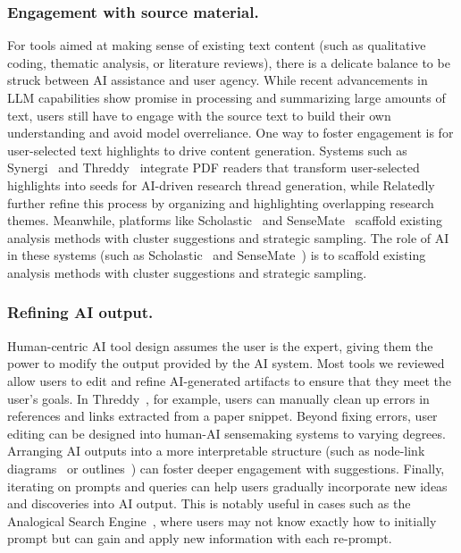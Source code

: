 \subsubsection{Engagement with source material.} For tools aimed at making sense of existing text content (such as qualitative coding, thematic analysis, or literature reviews), there is a delicate balance to be struck between AI assistance and user agency. While recent advancements in LLM capabilities show promise in processing and summarizing large amounts of text, users still have to engage with the source text to build their own understanding and avoid model overreliance. One way to foster engagement is for user-selected text highlights to drive content generation. Systems such as Synergi~\cite{synergi} and Threddy~\cite{threddy} integrate PDF readers that transform user-selected highlights into seeds for AI-driven research thread generation, while Relatedly~\cite{Relatedly} further refine this process by organizing and highlighting overlapping research themes. Meanwhile, platforms like Scholastic~\cite{scholastic} and SenseMate~\cite{sensemate} scaffold existing analysis methods with cluster suggestions and strategic sampling. The role of AI in these systems (such as Scholastic~\cite{scholastic} and SenseMate~\cite{sensemate}) is to scaffold existing analysis methods with cluster suggestions and strategic sampling.

\subsubsection{Refining AI output.} Human-centric AI tool design assumes the user is the expert, giving them the power to modify the output provided by the AI system. Most tools we reviewed allow users to edit and refine AI-generated artifacts to ensure that they meet the user's goals. In Threddy~\cite{threddy}, for example, users can manually clean up errors in references and links extracted from a paper snippet. Beyond fixing errors, user editing can be designed into human-AI sensemaking systems to varying degrees. Arranging AI outputs into a more interpretable structure (such as node-link diagrams~\cite{IdeaSynth, CoQuest} or outlines~\cite{synergi}) can foster deeper engagement with suggestions. Finally, iterating on prompts and queries can help users gradually incorporate new ideas and discoveries into AI output. This is notably useful in cases such as the Analogical Search Engine~\cite{AnalogicalSearchEngine}, where users may not know exactly how to initially prompt but can gain and apply new information with each re-prompt. 

